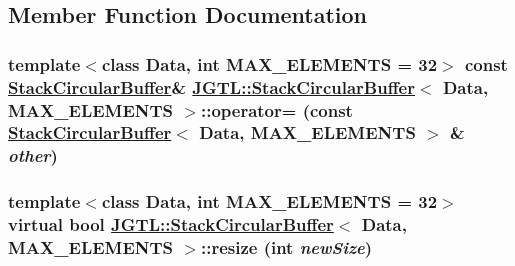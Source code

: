 \subsection{Member Function Documentation}
\hypertarget{class_j_g_t_l_1_1_stack_circular_buffer_1a099357e861a7baa232b3ee3ecbd6f4}{
\subsubsection[operator=]{\setlength{\rightskip}{0pt plus 5cm}template$<$class Data, int MAX\_\-ELEMENTS = 32$>$ const \hyperlink{class_j_g_t_l_1_1_stack_circular_buffer}{Stack\-Circular\-Buffer}\& \hyperlink{class_j_g_t_l_1_1_stack_circular_buffer}{JGTL::Stack\-Circular\-Buffer}$<$ Data, MAX\_\-ELEMENTS $>$::operator= (const \hyperlink{class_j_g_t_l_1_1_stack_circular_buffer}{Stack\-Circular\-Buffer}$<$ Data, MAX\_\-ELEMENTS $>$ \& {\em other})}}
\label{class_j_g_t_l_1_1_stack_circular_buffer_1a099357e861a7baa232b3ee3ecbd6f4}


\hypertarget{class_j_g_t_l_1_1_stack_circular_buffer_07b33fe01ef78d42d06a2cce77ffd2be}{
\subsubsection[resize]{\setlength{\rightskip}{0pt plus 5cm}template$<$class Data, int MAX\_\-ELEMENTS = 32$>$ virtual bool \hyperlink{class_j_g_t_l_1_1_stack_circular_buffer}{JGTL::Stack\-Circular\-Buffer}$<$ Data, MAX\_\-ELEMENTS $>$::resize (int {\em new\-Size})}}
\label{class_j_g_t_l_1_1_stack_circular_buffer_07b33fe01ef78d42d06a2cce77ffd2be}




